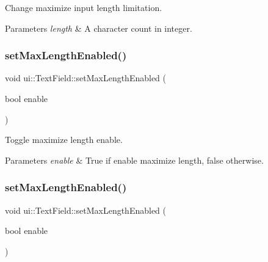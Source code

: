 Change maximize input length limitation. 


\begin{DoxyParams}{Parameters}
{\em length} & A character count in integer. \\
\hline
\end{DoxyParams}
\mbox{\label{classui_1_1TextField_a519ce96bf6df5bf88f1952ddf0acfa7a}} 
\subsubsection{\texorpdfstring{set\+Max\+Length\+Enabled()}{setMaxLengthEnabled()}\hspace{0.1cm}{\footnotesize\ttfamily [1/2]}}
{\footnotesize\ttfamily void ui\+::\+Text\+Field\+::set\+Max\+Length\+Enabled (\begin{DoxyParamCaption}\item[{bool}]{enable }\end{DoxyParamCaption})}



Toggle maximize length enable. 


\begin{DoxyParams}{Parameters}
{\em enable} & True if enable maximize length, false otherwise. \\
\hline
\end{DoxyParams}
\mbox{\label{classui_1_1TextField_a519ce96bf6df5bf88f1952ddf0acfa7a}} 
\subsubsection{\texorpdfstring{set\+Max\+Length\+Enabled()}{setMaxLengthEnabled()}\hspace{0.1cm}{\footnotesize\ttfamily [2/2]}}
{\footnotesize\ttfamily void ui\+::\+Text\+Field\+::set\+Max\+Length\+Enabled (\begin{DoxyParamCaption}\item[{bool}]{enable }\end{DoxyParamCaption})}



